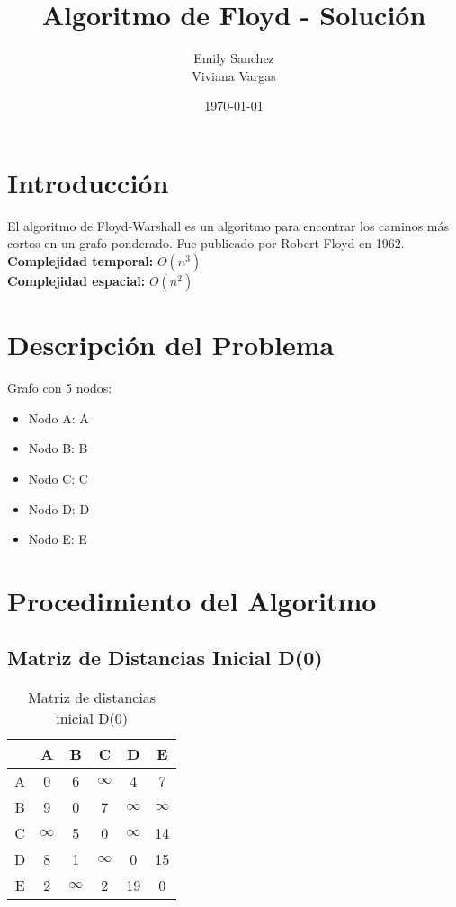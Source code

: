 \documentclass[12pt]{article}
\title{Algoritmo de Floyd - Solución}
\author{Emily Sanchez \\ Viviana Vargas}
\date{\today}
\begin{document}
\maketitle
\thispagestyle{empty}
\newpage
\setcounter{page}{1}

\section{Introducción}
El algoritmo de Floyd-Warshall es un algoritmo para encontrar los caminos más cortos en un grafo ponderado. Fue publicado por Robert Floyd en 1962.\\
\textbf{Complejidad temporal:} $O(n^3)$\\
\textbf{Complejidad espacial:} $O(n^2)$

\section{Descripción del Problema}
Grafo con 5 nodos:

\begin{itemize}
\item Nodo A: A
\item Nodo B: B
\item Nodo C: C
\item Nodo D: D
\item Nodo E: E
\end{itemize}

\section{Procedimiento del Algoritmo}
\subsection{Matriz de Distancias Inicial D(0)}
\begin{table}[h!]
\centering
\begin{tabular}{|c|c|c|c|c|c|}
\hline
 & A & B & C & D & E \\\hline
A & 0 & 6 & $\infty$ & 4 & 7 \\\hline
B & 9 & 0 & 7 & $\infty$ & $\infty$ \\\hline
C & $\infty$ & 5 & 0 & $\infty$ & 14 \\\hline
D & 8 & 1 & $\infty$ & 0 & 15 \\\hline
E & 2 & $\infty$ & 2 & 19 & 0 \\\hline
\end{tabular}
\caption{Matriz de distancias inicial D(0)}
\end{table}
\end{document}
